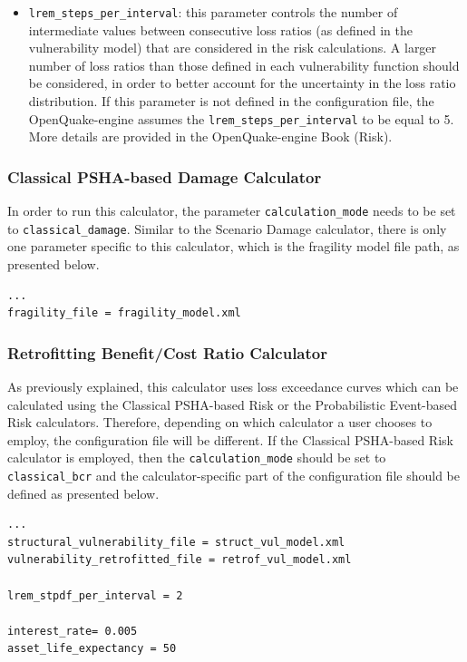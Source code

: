 \begin{itemize}
\item  \Verb+lrem_steps_per_interval+: this parameter controls the number of intermediate values between consecutive loss ratios (as defined in the \gls{vulnerability model}) that are considered in the risk calculations. A larger number of loss ratios than those defined in each \gls{vulnerability function} should be considered, in order to better account for the uncertainty in the loss ratio distribution. If this parameter is not defined in the configuration file, the OpenQuake-engine assumes the \Verb+lrem_steps_per_interval+ to be equal to 5. More details are provided in the OpenQuake-engine Book (Risk).
\end{itemize}


\subsubsection{Classical PSHA-based Damage Calculator}
In order to run this calculator, the parameter \Verb+calculation_mode+ needs to be set to \Verb+classical_damage+. Similar to the Scenario Damage calculator, there is only one parameter specific to this calculator, which is the \gls{fragility model} file path, as presented below.
\begin{Verbatim}[frame=single, commandchars=\\\{\}, samepage=true]
...
fragility_file = fragility_model.xml
\end{Verbatim}

\subsubsection{Retrofitting Benefit/Cost Ratio Calculator}
As previously explained, this calculator uses loss exceedance curves which can be calculated using the Classical PSHA-based Risk or the Probabilistic Event-based Risk calculators. Therefore, depending on which calculator a user chooses to employ, the configuration file will be different. If the Classical PSHA-based Risk calculator is employed, then the \Verb+calculation_mode+ should be set to \Verb+classical_bcr+ and the calculator-specific part of the configuration file should be defined as presented below.

\begin{Verbatim}[frame=single, commandchars=\\\{\}, samepage=true]
...
structural_vulnerability_file = struct_vul_model.xml
vulnerability_retrofitted_file = retrof_vul_model.xml

lrem_stpdf_per_interval = 2

interest_rate= 0.005
asset_life_expectancy = 50
\end{Verbatim}

